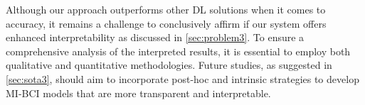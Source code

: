 Although our approach outperforms other DL solutions when it comes to accuracy, it remains a challenge to conclusively affirm if our system offers enhanced interpretability as discussed in \cref{sec:problem3}. To ensure a comprehensive analysis of the interpreted results, it is essential to employ both qualitative and quantitative methodologies. Future studies, as suggested in \cref{sec:sota3}, should aim to incorporate post-hoc and intrinsic strategies to develop MI-BCI models that are more transparent and interpretable.